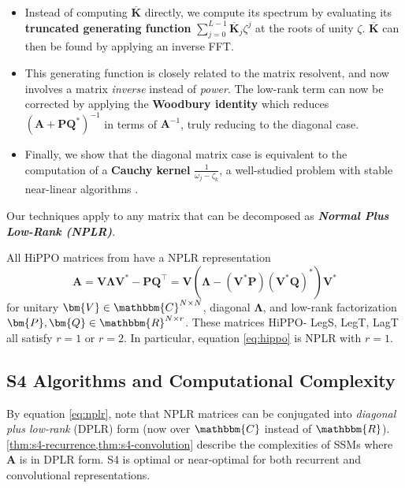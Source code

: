 \begin{itemize}[leftmargin=*]
  \item Instead of computing \( \bm{\overline{K}} \) directly, we compute its spectrum by evaluating its \textbf{truncated generating function} \( \sum_{j=0}^{L-1} \bm{\overline{K}}_j \zeta^j \) at the roots of unity \( \zeta \).
    \( \bm{\overline{K}} \) can then be found by applying an inverse FFT.
  \item This generating function is closely related to the matrix resolvent, and now involves a matrix \emph{inverse} instead of \emph{power}.
    The low-rank term can now be corrected by applying the \textbf{Woodbury identity} which reduces \( (\bm{A} + \bm{P}\bm{Q}^*)^{-1} \) in terms of \( \bm{A}^{-1} \), truly reducing to the diagonal case.
  \item Finally, we show that the diagonal matrix case is equivalent to the computation of a \textbf{Cauchy kernel} \( \frac{1}{\omega_j - \zeta_k} \), a well-studied problem with stable near-linear algorithms \citep{pan2015transformations,pan2017fast}.
\end{itemize}

Our techniques apply to any matrix that can be decomposed as \emph{\textbf{Normal Plus Low-Rank (NPLR)}}.

\begin{theorem}
  \label{thm:hippo-nplr}
  All HiPPO matrices from \citep{gu2020hippo} have a NPLR representation
  \begin{equation}
    \label{eq:nplr}
    \bm{A} = \bm{V} \bm{\Lambda} \bm{V}^* - \bm{P} \bm{Q}^\top = \bm{V} \left( \bm{\Lambda} - \left(\bm{V}^* \bm{P}\right) (\bm{V}^*\bm{Q})^* \right) \bm{V}^*
  \end{equation}
  for unitary \( \bm{V} \in \mathbbm{C}^{N \times N} \), diagonal \( \bm{\Lambda} \), and low-rank factorization \( \bm{P}, \bm{Q} \in \mathbbm{R}^{N \times r} \).
  These matrices HiPPO- LegS, LegT, LagT all satisfy \( r=1 \) or \( r=2 \).
  In particular, equation \eqref{eq:hippo} is NPLR with \( r=1 \).
\end{theorem}

\subsection{S4 Algorithms and Computational Complexity}
\label{sec:s4-efficiency}

By equation \eqref{eq:nplr}, note that NPLR matrices can be conjugated into \emph{diagonal plus low-rank} (DPLR) form (now over \( \mathbbm{C} \) instead of \( \mathbbm{R} \)).
\ref{thm:s4-recurrence,thm:s4-convolution} describe the complexities of SSMs where \( \bm{A} \) is in DPLR form. S4 is optimal or near-optimal for both recurrent and convolutional representations.


